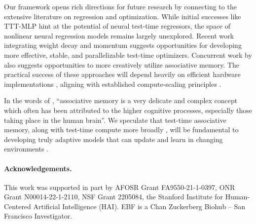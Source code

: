 \documentclass[notitlepage, 11pt]{article}
\begin{document}
Our framework opens rich directions for future research by connecting to the extensive literature on regression and optimization. While initial successes like TTT-MLP \citep{Sun2024LearningLearnTest} hint at the potential of neural test-time regressors, the space of nonlinear neural regression models remains largely unexplored.
Recent work integrating weight decay and momentum \citep{Behrouz2024TitansLearningMemorize,Yang2024GatedDeltaNetworks} suggests opportunities for developing more effective, stable, and parallelizable test-time optimizers.
Concurrent work by \citet{Behrouz2024TitansLearningMemorize} also suggests opportunities to more creatively utilize associative memory.
The practical success of these approaches will depend heavily on efficient hardware implementations \citep{Hua2022TransformerQualityLinear,Yang2024ParallelizingLinearTransformers,Sun2024LearningLearnTest,Dao2024TransformersAreSSMs,Dao2022FlashAttentionFastMemoryEfficient},
aligning with established compute-scaling principles \citep{Sutton2019BitterLesson,Hoffmann2022TrainingComputeOptimalLarge,Kaplan2020ScalingLawsNeural}.

In the words of \citet{Kohonen1989SelfOrganizationAssociativeMemory}, ``associative memory is a very delicate and complex concept which often
has been attributed to the higher cognitive processes, especially those taking
place in the human brain''.
We speculate that test-time associative memory, along with test-time compute more broadly \citep{Sun2024LearningLearnTest, Sun2020TestTimeTrainingSelfSupervision,Akyurek2024SurprisingEffectivenessTestTime}, will be fundamental to developing truly adaptive models that can update and learn in changing environments \citep{OpenAI2024OpenAIO1System}.

\paragraph{Acknowledgements.} This work was supported in part by AFOSR Grant FA9550-21-1-0397, ONR Grant N00014-22-1-2110, NSF Grant 2205084, the Stanford Institute for Human-Centered Artificial Intelligence (HAI). EBF is a Chan Zuckerberg Biohub – San Francisco Investigator.
{\small
    
}

\appendix
\appendixpage
\end{document}
